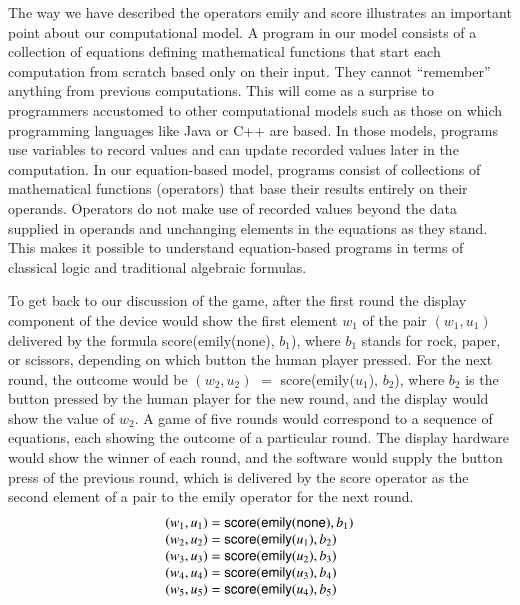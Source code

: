 The way we have described the operators \textsf{emily} and \textsf{score}
illustrates an important point about our computational model.
A program in our model consists of a collection of equations
defining mathematical functions that start each computation from scratch
based only on their input. They cannot ``remember'' anything from previous computations.
This will come as a surprise to programmers accustomed
to other computational models such as those on which
programming languages like Java or C++ are based.
In those models, programs use variables to record values
and can update recorded values later in the computation.
In our equation-based model,
programs consist of collections of mathematical functions (operators)
that base their results entirely on their operands.
Operators do not make use of recorded values
beyond the data supplied in operands
and unchanging elements in the equations as they stand.
This makes it possible to
understand equation-based programs in terms of classical
logic and traditional algebraic formulas.

To get back to our discussion of the game,
after the first round the display component of the device
would show the first element $w_1$ of the pair $(w_1, u_1)$ delivered by the formula
\textsf{score}(\textsf{emily}(\textsf{none}), $b_1$),
where $b_1$ stands for rock, paper, or scissors, depending on which button
the human player pressed.
For the next round, the outcome would be
$(w_2, u_2)$ $=$ \textsf{score}(\textsf{emily}($u_1$), $b_2$),
where $b_2$ is the button pressed by the human player for the new round,
and the display would show the value of $w_2$.
A game of five rounds would correspond to a sequence of equations,
each showing the outcome of a particular round.
The display hardware would show the winner of each round,
and the software would supply the button press of the previous round, which
is delivered by the \textsf{score} operator as the second
element of a pair to the \textsf{emily} operator for the next round.
\begin{displaymath}
        \begin{array}{ll}
        (w_1, u_1) = \mbox{\textsf{score}}(\mbox{\textsf{emily}}(\mbox{\textsf{none}}), b_1) \\
        (w_2, u_2) = \mbox{\textsf{score}}(\mbox{\textsf{emily}}(u_1), b_2) \\
        (w_3, u_3) = \mbox{\textsf{score}}(\mbox{\textsf{emily}}(u_2), b_3) \\
        (w_4, u_4) = \mbox{\textsf{score}}(\mbox{\textsf{emily}}(u_3), b_4) \\
        (w_5, u_5) = \mbox{\textsf{score}}(\mbox{\textsf{emily}}(u_4), b_5)
        \end{array}
\end{displaymath}

